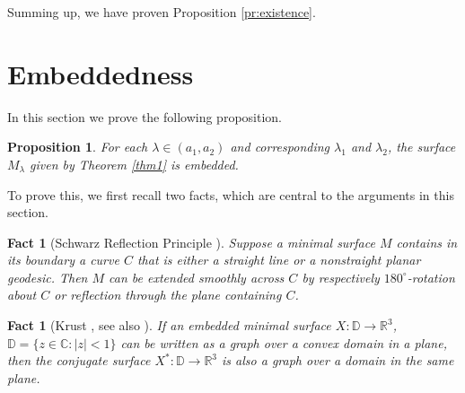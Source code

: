 \documentclass[11pt]{amsart}
\newcommand{\R}{\mathbb{R}}
\newcommand{\C}{\mathbb{C}}
\newcommand{\D}{\mathbb{D}}
\numberwithin{equation}{section}
\numberwithin{figure}{section}
\theoremstyle{plain} %
\newtheorem{proposition}[theorem]{Proposition}
\newtheorem{fact}[theorem]{Fact}
\theoremstyle{definition} %
\begin{document}
Summing up, we have proven Proposition \ref{pr:existence}.

\section{Embeddedness}
\label{embedded}

In this section we prove the following proposition. 

\begin{proposition}\label{pr:embedded}
For each $\lambda\in(a_1,a_2)$ and corresponding $\lambda_1$ and $\lambda_2$, the surface $M_{\lambda}$ given by Theorem \ref{thm1} is embedded.
\end{proposition}

To prove this, we first recall two facts, which are central to the arguments in this section. 

\begin{fact}[Schwarz Reflection Principle {\cite[Theorem 1.5.1]{ka6}}]\label{th:reflection}
Suppose a minimal surface $M$ contains in its boundary a curve $C$ that is either a straight line or a nonstraight planar geodesic. 
Then $M$ can be extended smoothly across $C$ by respectively $180^\circ$-rotation about $C$ or reflection through the plane containing $C$. 
\end{fact}

\begin{fact}[Krust {\cite[Theorem 2.4.1]{ka6}}, see also {\cite[Theorem 3.1]{dor}}]\label{th:krust}
If an embedded minimal surface $X:\D\to\R^3$, $\D=\{z\in\C:|z|<1\}$ can be written as a graph over a convex domain in a plane, then the conjugate surface $X^*:\D\to\R^3$ is also a graph over a domain in the same plane. 
\end{fact}
\end{document}
